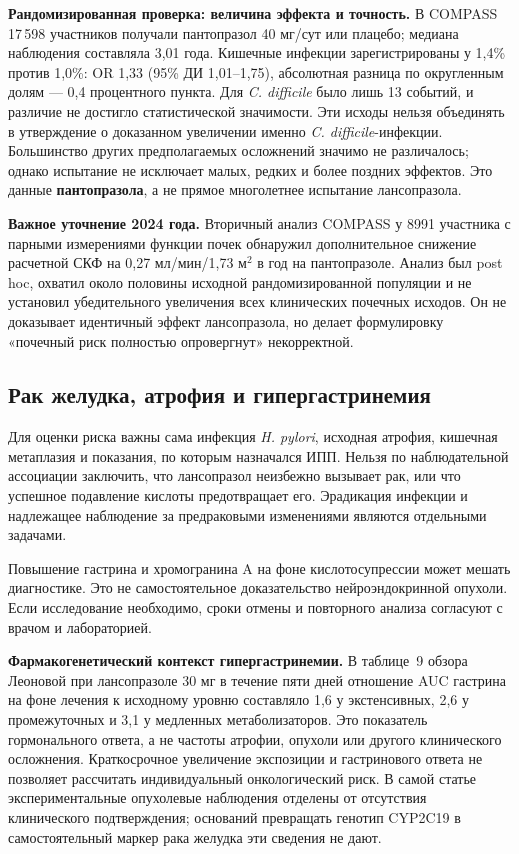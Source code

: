 \documentclass[11pt,a4paper,notitlepage]{report}
\newcommand{\Hp}{\textit{H. pylori}}
\newcommand{\src}[1]{\unskip\space\cite{#1}}
\begin{document}
\textbf{Рандомизированная проверка: величина эффекта и точность.} В COMPASS 17\,598 участников получали пантопразол 40 мг/сут или плацебо; медиана наблюдения составляла 3,01 года. Кишечные инфекции зарегистрированы у 1,4\% против 1,0\%: OR 1,33 (95\% ДИ 1,01--1,75), абсолютная разница по округленным долям --- 0,4 процентного пункта. Для \textit{C. difficile} было лишь 13 событий, и различие не достигло статистической значимости. Эти исходы нельзя объединять в утверждение о доказанном увеличении именно \textit{C. difficile}-инфекции. Большинство других предполагаемых осложнений значимо не различалось; однако испытание не исключает малых, редких и более поздних эффектов. Это данные \textbf{пантопразола}, а не прямое многолетнее испытание лансопразола.\src{compass}

\textbf{Важное уточнение 2024 года.} Вторичный анализ COMPASS у 8991 участника с парными измерениями функции почек обнаружил дополнительное снижение расчетной СКФ на 0,27 мл/мин/1,73 м$^2$ в год на пантопразоле. Анализ был post hoc, охватил около половины исходной рандомизированной популяции и не установил убедительного увеличения всех клинических почечных исходов. Он не доказывает идентичный эффект лансопразола, но делает формулировку «почечный риск полностью опровергнут» некорректной.\src{kidney}

\subsection{Рак желудка, атрофия и гипергастринемия}
Для оценки риска важны сама инфекция \Hp, исходная атрофия, кишечная метаплазия и показания, по которым назначался ИПП. Нельзя по наблюдательной ассоциации заключить, что лансопразол неизбежно вызывает рак, или что успешное подавление кислоты предотвращает его. Эрадикация инфекции и надлежащее наблюдение за предраковыми изменениями являются отдельными задачами.\src{maastricht,rfgastrit,jhp}

Повышение гастрина и хромогранина A на фоне кислотосупрессии может мешать диагностике. Это не самостоятельное доказательство нейроэндокринной опухоли. Если исследование необходимо, сроки отмены и повторного анализа согласуют с врачом и лабораторией.\src{uslabel}

\textbf{Фармакогенетический контекст гипергастринемии.} В таблице~9 обзора Леоновой при лансопразоле 30 мг в течение пяти дней отношение AUC гастрина на фоне лечения к исходному уровню составляло 1,6 у экстенсивных, 2,6 у промежуточных и 3,1 у медленных метаболизаторов. Это показатель гормонального ответа, а не частоты атрофии, опухоли или другого клинического осложнения. Краткосрочное увеличение экспозиции и гастринового ответа не позволяет рассчитать индивидуальный онкологический риск. В самой статье экспериментальные опухолевые наблюдения отделены от отсутствия клинического подтверждения; оснований превращать генотип CYP2C19 в самостоятельный маркер рака желудка эти сведения не дают.\src{leonova2015}
\end{document}
